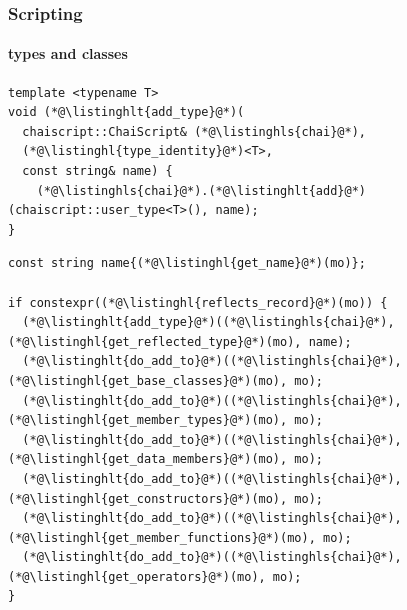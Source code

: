 \documentclass[compress,table,xcolor=table]{beamer}
\begin{document}
\begin{frame}[fragile]
  \frametitle{Scripting}
  \framesubtitle{types and classes}
  \begin{lstlisting}[language=c++2x,basicstyle=\footnotesize\ttfamily]
template <typename T>
void (*@\listinghlt{add_type}@*)(
  chaiscript::ChaiScript& (*@\listinghls{chai}@*),
  (*@\listinghl{type_identity}@*)<T>,
  const string& name) {
    (*@\listinghls{chai}@*).(*@\listinghlt{add}@*)(chaiscript::user_type<T>(), name);
}
  \end{lstlisting}
  \begin{lstlisting}[language=c++2x,basicstyle=\footnotesize\ttfamily]
const string name{(*@\listinghl{get_name}@*)(mo)};

if constexpr((*@\listinghl{reflects_record}@*)(mo)) {
  (*@\listinghlt{add_type}@*)((*@\listinghls{chai}@*),  (*@\listinghl{get_reflected_type}@*)(mo), name);
  (*@\listinghlt{do_add_to}@*)((*@\listinghls{chai}@*), (*@\listinghl{get_base_classes}@*)(mo), mo);
  (*@\listinghlt{do_add_to}@*)((*@\listinghls{chai}@*), (*@\listinghl{get_member_types}@*)(mo), mo);
  (*@\listinghlt{do_add_to}@*)((*@\listinghls{chai}@*), (*@\listinghl{get_data_members}@*)(mo), mo);
  (*@\listinghlt{do_add_to}@*)((*@\listinghls{chai}@*), (*@\listinghl{get_constructors}@*)(mo), mo);
  (*@\listinghlt{do_add_to}@*)((*@\listinghls{chai}@*), (*@\listinghl{get_member_functions}@*)(mo), mo);
  (*@\listinghlt{do_add_to}@*)((*@\listinghls{chai}@*), (*@\listinghl{get_operators}@*)(mo), mo);
}
  \end{lstlisting}
\end{frame}
\end{document}
